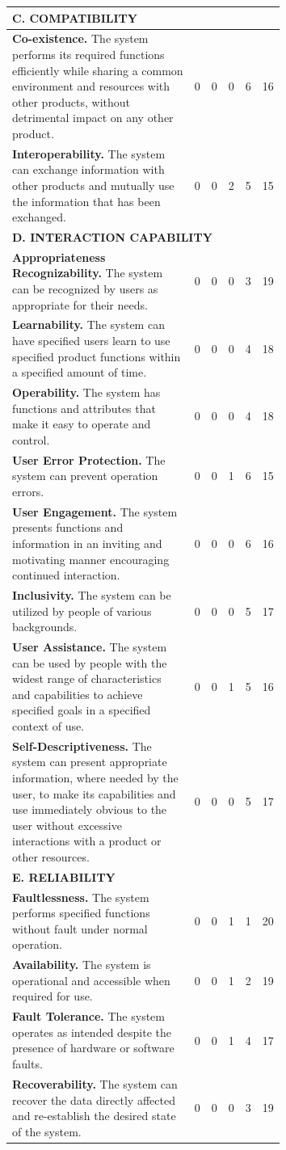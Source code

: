 \begin{longtable}{p{0.67\linewidth} c c c c c}
\multicolumn{6}{l}{\textbf{C. COMPATIBILITY}} \\
\midrule
\textbf{Co-existence.} The system performs its required functions efficiently while sharing a common environment and resources with other products, without detrimental impact on any other product. & 0 & 0 & 0 & 6 & 16 \\
\textbf{Interoperability.} The system can exchange information with other products and mutually use the information that has been exchanged. & 0 & 0 & 2 & 5 & 15 \\
\midrule

\multicolumn{6}{l}{\textbf{D. INTERACTION CAPABILITY}} \\
\midrule
\textbf{Appropriateness Recognizability.} The system can be recognized by users as appropriate for their needs. & 0 & 0 & 0 & 3 & 19 \\
\textbf{Learnability.} The system can have specified users learn to use specified product functions within a specified amount of time. & 0 & 0 & 0 & 4 & 18 \\
\textbf{Operability.} The system has functions and attributes that make it easy to operate and control. & 0 & 0 & 0 & 4 & 18 \\
\textbf{User Error Protection.} The system can prevent operation errors. & 0 & 0 & 1 & 6 & 15 \\
\textbf{User Engagement.} The system presents functions and information in an inviting and motivating manner encouraging continued interaction. & 0 & 0 & 0 & 6 & 16 \\
\textbf{Inclusivity.} The system can be utilized by people of various backgrounds. & 0 & 0 & 0 & 5 & 17 \\
\textbf{User Assistance.} The system can be used by people with the widest range of characteristics and capabilities to achieve specified goals in a specified context of use. & 0 & 0 & 1 & 5 & 16 \\
\textbf{Self-Descriptiveness.} The system can present appropriate information, where needed by the user, to make its capabilities and use immediately obvious to the user without excessive interactions with a product or other resources. & 0 & 0 & 0 & 5 & 17 \\
\midrule

\multicolumn{6}{l}{\textbf{E. RELIABILITY}} \\
\midrule
\textbf{Faultlessness.} The system performs specified functions without fault under normal operation. & 0 & 0 & 1 & 1 & 20 \\
\textbf{Availability.} The system is operational and accessible when required for use. & 0 & 0 & 1 & 2 & 19 \\
\textbf{Fault Tolerance.} The system operates as intended despite the presence of hardware or software faults. & 0 & 0 & 1 & 4 & 17 \\
\textbf{Recoverability.} The system can recover the data directly affected and re-establish the desired state of the system. & 0 & 0 & 0 & 3 & 19 \\
\midrule


\end{longtable}
